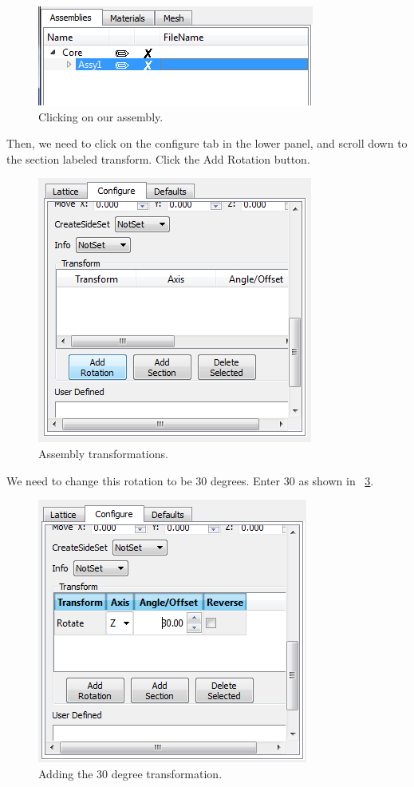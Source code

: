 \begin{figure}[H]
	\begin{center}
		\includegraphics[width=0.5\linewidth]{Images/hex-15.png}
		\caption{Clicking on our assembly.}
		\label{fig:Hex15}
	\end{center}
\end{figure}

Then, we need to click on the configure tab in the lower panel, and scroll down to the section labeled transform.  Click the Add Rotation button.

\begin{figure}[H]
	\begin{center}
		\includegraphics[width=0.5\linewidth]{Images/hex-16.png}
		\caption{Assembly transformations.}
		\label{fig:Hex16}
	\end{center}
\end{figure}

We need to change this rotation to be 30 degrees.  Enter 30 as shown in ~\ref{fig:Hex17}.

\begin{figure}[H]
	\begin{center}
		\includegraphics[width=0.5\linewidth]{Images/hex-17.png}
		\caption{Adding the 30 degree transformation.}
		\label{fig:Hex17}
	\end{center}
\end{figure}

